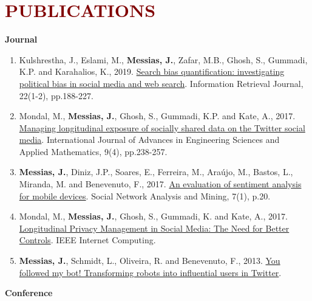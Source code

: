 
\section*{\textcolor{maroon}{\normalsize PUBLICATIONS}} 

\textbf{Journal}

\begin{enumerate}

\item Kulshrestha, J., Eslami, M., \textbf{Messias, J.}, Zafar, M.B., Ghosh, S., Gummadi, K.P. and Karahalios, K., 2019. \href{https://t.co/RaTVDuUiMG}{Search bias quantification: investigating political bias in social media and web search}. Information Retrieval Journal, 22(1-2), pp.188-227.
\item Mondal, M., \textbf{Messias, J.}, Ghosh, S., Gummadi, K.P. and Kate, A., 2017. \href{http://rdcu.be/ARJP}{Managing longitudinal exposure of socially shared data on the Twitter social media}. International Journal of Advances in Engineering Sciences and Applied Mathematics, 9(4), pp.238-257.
\item \textbf{Messias, J.}, Diniz, J.P., Soares, E., Ferreira, M., Araújo, M., Bastos, L., Miranda, M. and Benevenuto, F., 2017. \href{http://rdcu.be/rZtC}{An evaluation of sentiment analysis for mobile devices}. Social Network Analysis and Mining, 7(1), p.20.
\item Mondal, M., \textbf{Messias, J.}, Ghosh, S., Gummadi, K. and Kate, A., 2017. \href{https://people.mpi-sws.org/~johnme/pdf/mondal_ic17.pdf}{Longitudinal Privacy Management in Social Media: The Need for Better Controls}. IEEE Internet Computing.
\item \textbf{Messias, J.}, Schmidt, L., Oliveira, R. and Benevenuto, F., 2013. \href{http://firstmonday.org/ojs/index.php/fm/article/view/4217/3700}{You followed my bot! Transforming robots into influential users in Twitter}.

\end{enumerate}

\textbf{Conference}

